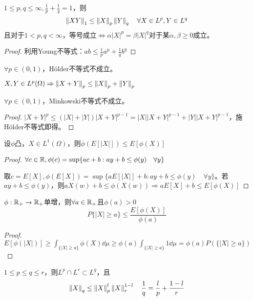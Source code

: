 \documentclass{ctexbook}
\begin{document}
\begin{Thm}[H\"older]
  $1\leq p,q\leq \infty,\frac{1}{p}+\frac{1}{q}=1$，则
  \[\left\|XY\right\|_{1}\leq \left\|X\right\|_{p}\left\|Y\right\|_{q}\quad \forall X\in L^{p}, Y\in L^{q}\]
  且对于$1<p,q<\infty$，等号成立$\Leftrightarrow \alpha |X|^{p}=\beta|X|^{q}$对于某$\alpha,\beta\geq 0$成立。
\end{Thm}

\begin{proof}
  利用Young不等式：$ab\leq \frac{1}{p}a^{p}+\frac{1}{q}b^{q}$
\end{proof}

\begin{Rmk}
  $\forall p\in(0,1)$，H\"older不等式不成立。
\end{Rmk}

\begin{Thm}[Minkowski]
  $X,Y\in L^{p}(\Omega)\Rightarrow \left\|X+Y\right\|_{p}\leq \left\|X\right\|_{p}+\left\|Y\right\|_{p}$
\end{Thm}

\begin{Rmk}
  $\forall p\in(0,1)$，Minkowski不等式不成立。
\end{Rmk}

\begin{proof}
  $|X+Y|^{p}\leq (|X|+|Y|)|X+Y|^{p-1}=|X||X+Y|^{p-1}+|Y||X+Y|^{p-1}$，施H\"older不等式即得。
\end{proof}

\begin{Thm}[Jensen]
  设$\phi$凸，$X\in L^{1}(\Omega)$，则$\phi(E[|X|])\leq E[\phi(X)]$
\end{Thm}

\begin{proof}
  $\forall c\in\mathbb{R},\phi(c)=\sup\{ac+b:ay+b\leq \phi(y)\quad\forall y\}$

  取$c=E[X],\phi(E[X])=\sup\{aE[|X|]+b:ay+b\leq \phi(y)\quad\forall y\}$。若$ay+b\leq\phi(y)$，则$aX(w)+b\leq \phi(X(w))\Rightarrow aE[X]+b\leq E[\phi(X)]$
\end{proof}

\begin{Thm}[Chebyshev]
  $\phi:\mathbb{R}_{+}\to\mathbb{R}_{+}$单增，则$\forall a\in\mathbb{R}_{+}$且$\phi(a)>0$
  \[P\{|X|\geq a\}\leq \frac{E[\phi(X)]}{\phi(a)}\]
\end{Thm}
\begin{proof}
  $E[\phi(|X|)]\geq \int_{\{|X|\geq a\}}\phi(X)\dd\mu\geq \phi(a)\int_{\{|X|\geq a\}}1\dd\mu=\phi(a)P(\{|X|\geq a\})$
\end{proof}

\begin{Eg}[Interpolation]
  $1\leq p\leq q\leq r$，则$L^{p}\cap L^{r}\subset L^{q}$，且
  \[\left\|X\right\|_{q}\leq \left\|X\right\|_{p}^{l}\left\|X\right\|_{r}^{1-l}\quad \frac{1}{q}=\frac{l}{p}+\frac{1-l}{r}\]
\end{Eg}
\end{document}

